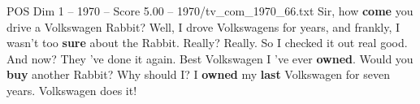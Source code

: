 \begin{textsample}{POS Dim 1 – 1970 – Score 5.00 – 1970/tv\_com\_1970\_66.txt}  \label{ex:f1_pos_032}
Sir, how \textbf{come} you drive a Volkswagen Rabbit?
Well, I drove Volkswagens for years, and frankly, I wasn't too \textbf{sure} about the Rabbit.
Really?
Really.
So I checked it out real good.
And now?
They 've done it again.
Best Volkswagen I 've ever \textbf{owned}.
Would you \textbf{buy} another Rabbit?
Why should I?
I \textbf{owned} my \textbf{last} Volkswagen for seven years.
Volkswagen does it!

\end{textsample}
